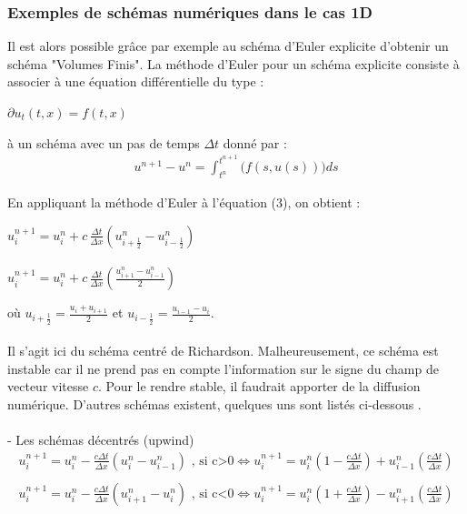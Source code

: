 \documentclass[12pt]{article}
\begin{document}
\subsubsection{Exemples de schémas numériques dans le cas 1D}

\noindent Il est alors possible grâce par exemple au schéma d'Euler explicite d'obtenir un schéma "Volumes Finis".
La méthode d'Euler pour un schéma explicite consiste à associer à une équation différentielle du type :
\begin{center}
        $\partial u_t(t,x)=f(t,x)$
\end{center}
à un schéma avec un pas de temps $\Delta t$ donné par :
\begin{eqnarray}
        u^{n+1}-u^{n} =  \int_{t^{n}}^{t^{n+1}}\big(f(s,u(s)))ds
\end{eqnarray}

\newpage \noindent En appliquant la méthode d'Euler à l'équation (3), on obtient :

\begin{center}
        $u^{n+1}_i=u_i^n + \displaystyle c \, \frac{\Delta t}{\Delta x}(u_{i+\frac{1}{2}}^n-u_{i-\frac{1}{2}}^n)$
        \leavevmode\\
        \leavevmode\\
        $u^{n+1}_i=u_i^n +  \displaystyle c \, \frac{\Delta t}{\Delta x}\left(\frac{u_{i+1}^n-u_{i-1}^n}{2}\right)$
\end{center}

\noindent où $u_{i+\frac{1}{2}} = \displaystyle\frac{u_i+u_{i+1}}{2}$ \: et \: $u_{i-\frac{1}{2}} = \displaystyle\frac{u_{i-1}-u_{i}}{2}$.
\\
\\
Il s'agit ici du schéma centré de Richardson. Malheureusement, ce schéma est instable car il ne prend pas en compte l'information sur le signe du champ de vecteur vitesse $c$. Pour le rendre stable, il faudrait apporter de la diffusion numérique.
D'autres schémas existent, quelques uns sont listés ci-dessous \cite{ref11}.
\\
\\- Les schémas décentrés (upwind)
\begin{eqnarray*}
        u^{n+1}_i=u_i^n-\frac{c\Delta t}{\Delta x}({u_{i}^n-u_{i-1}^n}) \text{       , si c>0}
        \iff u^{n+1}_i=u_i^n\left(1-\frac{c\Delta t}{\Delta x}\right)+u_{i-1}^n\left(\frac{c\Delta t}{\Delta x}\right)	
        \\
        \\
        u^{n+1}_i=u_i^n-\frac{c\Delta t}{\Delta x}({u_{i+1}^n-u_{i}^n}) \text{       , si c<0}
        \iff u^{n+1}_i=u_i^n\left(1+\frac{c\Delta t}{\Delta x}\right)-u_{i+1}^n\left(\frac{c\Delta t}{\Delta x}\right)
\end{eqnarray*}
\end{document}
